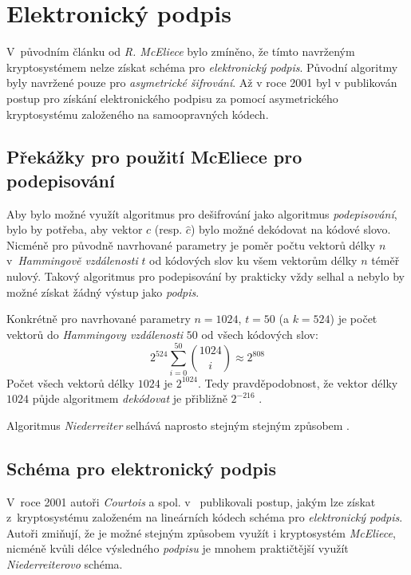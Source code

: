 \documentclass[thesis=M,czech,hidelinks]{FITthesis}[2012/06/26]
\newcommand{\0}{{\textcolor[gray]{0.80}{0}}}
\begin{document}
\section{Elektronický podpis}
V~původním článku od \emph{R. McEliece} \cite{McEliece} bylo zmíněno, že tímto
navrženým kryptosystémem nelze získat schéma pro \emph{elektronický podpis}.
Původní algoritmy byly navržené pouze pro \emph{asymetrické šifrování}. Až
v roce 2001 byl v \cite{Courtois} publikován postup pro získání elektronického
podpisu za pomocí asymetrického kryptosystému založeného na samoopravných
kódech.

\subsection{Překážky pro použití McEliece pro podepisování}
Aby bylo možné využít algoritmus pro dešifrování jako algoritmus
\emph{podepisování}, bylo by potřeba, aby vektor $c$ (resp. $\hat{c}$) bylo
možné dekódovat na kódové slovo. Nicméně pro původně navrhované parametry je
poměr počtu vektorů délky $n$ v~\emph{Hammingově vzdálenosti} $t$
od kódových slov ku všem vektorům délky $n$ téměř nulový. Takový algoritmus pro
podepisování by prakticky vždy selhal a nebylo by možné získat žádný výstup jako
\emph{podpis}.

Konkrétně pro navrhované parametry $n=1024$, $t=50$ (a $k=524$) je počet
vektorů do \emph{Hammingovy vzdálenosti} $50$ od všech kódových slov:
$$ 2^{524}\sum_{i = 0}^{50}\binom{1024}{i} \approx 2^{808}$$
Počet všech vektorů délky $1024$ je $2^{1024}$. Tedy pravděpodobnost, že vektor
délky $1024$ půjde algoritmem \emph{dekódovat} je přibližně $2^{-216}$
\cite{McEliece}.

Algoritmus \emph{Niederreiter} selhává naprosto stejným stejným způsobem
\cite{Courtois}.

\subsection{Schéma pro elektronický podpis}
V~roce 2001 autoři \emph{Courtois} a spol. v~\cite{Courtois} publikovali postup,
jakým lze získat z~kryptosystému založeném na lineárních kódech schéma pro
\emph{elektronický podpis}. Autoři zmiňují, že je možné stejným způsobem využít
i kryptosystém \emph{McEliece}, nicméně kvůli délce výsledného \emph{podpisu} je
mnohem praktičtější využít \emph{Niederreiterovo} schéma.
\end{document}
